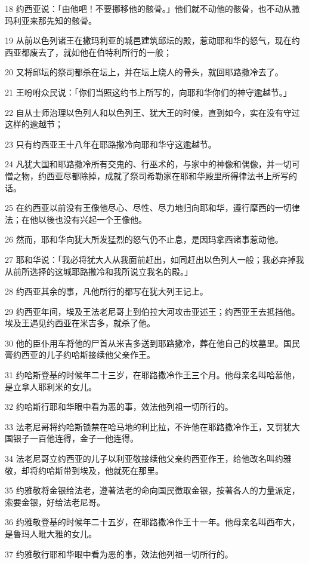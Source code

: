 \par 18 约西亚说：「由他吧！不要挪移他的骸骨。」他们就不动他的骸骨，也不动从撒玛利亚来那先知的骸骨。
\par 19 从前以色列诸王在撒玛利亚的城邑建筑邱坛的殿，惹动耶和华的怒气，现在约西亚都废去了，就如他在伯特利所行的一般；
\par 20 又将邱坛的祭司都杀在坛上，并在坛上烧人的骨头，就回耶路撒冷去了。
\par 21 王吩咐众民说：「你们当照这约书上所写的，向耶和华你们的神守逾越节。」
\par 22 自从士师治理以色列人和以色列王、犹大王的时候，直到如今，实在没有守过这样的逾越节；
\par 23 只有约西亚王十八年在耶路撒冷向耶和华守这逾越节。
\par 24 凡犹大国和耶路撒冷所有交鬼的、行巫术的，与家中的神像和偶像，并一切可憎之物，约西亚尽都除掉，成就了祭司希勒家在耶和华殿里所得律法书上所写的话。
\par 25 在约西亚以前没有王像他尽心、尽性、尽力地归向耶和华，遵行摩西的一切律法；在他以後也没有兴起一个王像他。
\par 26 然而，耶和华向犹大所发猛烈的怒气仍不止息，是因玛拿西诸事惹动他。
\par 27 耶和华说：「我必将犹大人从我面前赶出，如同赶出以色列人一般；我必弃掉我从前所选择的这城耶路撒冷和我所说立我名的殿。」
\par 28 约西亚其余的事，凡他所行的都写在犹大列王记上。
\par 29 约西亚年间，埃及王法老尼哥上到伯拉大河攻击亚述王；约西亚王去抵挡他。埃及王遇见约西亚在米吉多，就杀了他。
\par 30 他的臣仆用车将他的尸首从米吉多送到耶路撒冷，葬在他自己的坟墓里。国民膏约西亚的儿子约哈斯接续他父亲作王。
\par 31 约哈斯登基的时候年二十三岁，在耶路撒冷作王三个月。他母亲名叫哈慕他，是立拿人耶利米的女儿。
\par 32 约哈斯行耶和华眼中看为恶的事，效法他列祖一切所行的。
\par 33 法老尼哥将约哈斯锁禁在哈马地的利比拉，不许他在耶路撒冷作王，又罚犹大国银子一百他连得，金子一他连得。
\par 34 法老尼哥立约西亚的儿子以利亚敬接续他父亲约西亚作王，给他改名叫约雅敬，却将约哈斯带到埃及，他就死在那里。
\par 35 约雅敬将金银给法老，遵著法老的命向国民徵取金银，按著各人的力量派定，索要金银，好给法老尼哥。
\par 36 约雅敬登基的时候年二十五岁，在耶路撒冷作王十一年。他母亲名叫西布大，是鲁玛人毗大雅的女儿。
\par 37 约雅敬行耶和华眼中看为恶的事，效法他列祖一切所行的。


